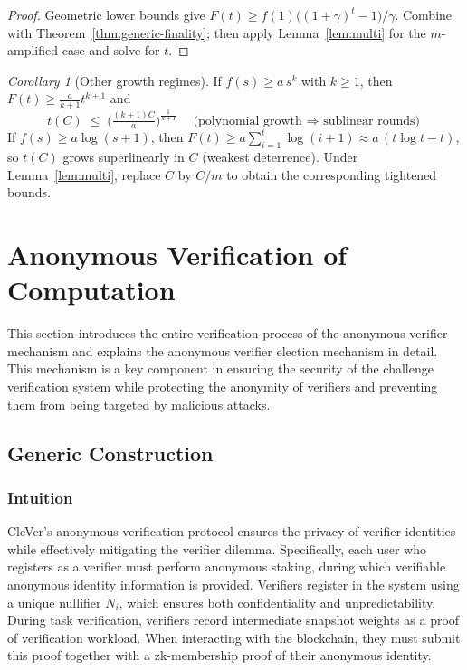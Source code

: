 \documentclass[3p]{elsarticle}
\theoremstyle{remark}
\newtheorem{corollary}{Corollary}
\begin{document}
\begin{proof}
Geometric lower bounds give $F(t)\ge f(1)\big((1+\gamma)^t-1\big)/\gamma$. Combine with Theorem~\ref{thm:generic-finality}; then apply Lemma~\ref{lem:multi} for the $m$-amplified case and solve for $t$.
\end{proof}

\begin{corollary}[Other growth regimes]\label{cor:other}
If $f(s)\ge a\,s^{k}$ with $k\ge 1$, then $F(t)\ge \frac{a}{k+1}t^{k+1}$ and
\[
t(C)\;\le\;\Big(\tfrac{(k+1)C}{a}\Big)^{\!\frac{1}{k+1}} \quad
\text{(polynomial growth $\Rightarrow$ sublinear rounds)}
\]
If $f(s)\ge a\log(s+1)$, then $F(t)\ge a\sum_{i=1}^{t}\log(i+1)\approx a\,(t\log t - t)$, so $t(C)$ grows superlinearly in $C$ (weakest deterrence). Under Lemma~\ref{lem:multi}, replace $C$ by $C/m$ to obtain the corresponding tightened bounds.
\end{corollary}

\section{Anonymous Verification of Computation} \label{sec:anony}

This section introduces the entire verification process of the anonymous verifier mechanism and explains the anonymous verifier election mechanism in detail. This mechanism is a key component in ensuring the security of the challenge verification system while protecting the anonymity of verifiers and preventing them from being targeted by malicious attacks.



\subsection{Generic Construction}

\subsubsection{Intuition}

CleVer's anonymous verification protocol ensures the privacy of verifier identities while effectively mitigating the verifier dilemma. Specifically, each user who registers as a verifier must perform anonymous staking, during which verifiable anonymous identity information is provided. Verifiers register in the system using a unique nullifier $N_i$, which ensures both confidentiality and unpredictability. During task verification, verifiers record intermediate snapshot weights as a proof of verification workload. When interacting with the blockchain, they must submit this proof together with a zk-membership proof of their anonymous identity.
\end{document}

